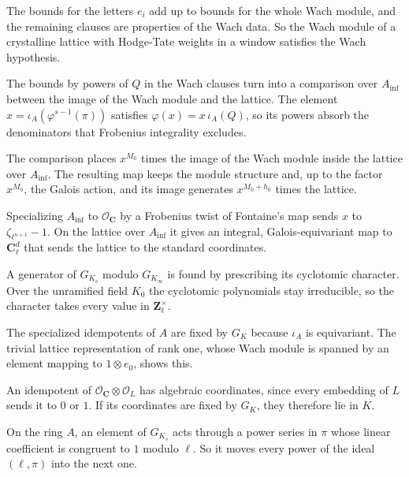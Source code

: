 The bounds for the letters $e_i$ add up to bounds for the whole Wach module,
and the remaining clauses are properties of the Wach data. So the Wach module
of a crystalline lattice with Hodge-Tate weights in a window satisfies the Wach
hypothesis.

The bounds by powers of $Q$ in the Wach clauses turn into a comparison over
$A_{\mathrm{inf}}$ between the image of the Wach module and the lattice. The
element $x=\iota_A(\varphi^{s-1}(\pi))$ satisfies $\varphi(x)=x\,\iota_A(Q)$,
so its powers absorb the denominators that Frobenius integrality excludes.

The comparison places $x^{M_0}$ times the image of the Wach module inside the
lattice over $A_{\mathrm{inf}}$. The resulting map keeps the module structure
and, up to the factor $x^{M_0}$, the Galois action, and its image generates
$x^{M_0+h_0}$ times the lattice.

Specializing $A_{\mathrm{inf}}$ to $\mathcal O_{\mathbf C}$ by a Frobenius twist
of Fontaine's map sends $x$ to $\zeta_{\ell^{n+1}}-1$. On the lattice over
$A_{\mathrm{inf}}$ it gives an integral, Galois-equivariant map to
$\mathbf C_\ell^d$ that sends the lattice to the standard coordinates.

A generator of $G_{K_s}$ modulo $G_{K_\infty}$ is found by prescribing its
cyclotomic character. Over the unramified field $K_0$ the cyclotomic polynomials
stay irreducible, so the character takes every value in $\mathbf Z_\ell^\times$.

The specialized idempotents of $A$ are fixed by $G_K$ because $\iota_A$ is
equivariant. The trivial lattice representation of rank one, whose Wach module
is spanned by an element mapping to $1\otimes e_0$, shows this.

An idempotent of $\mathcal O_{\mathbf C}\otimes\mathcal O_L$ has algebraic
coordinates, since every embedding of $L$ sends it to $0$ or $1$. If its
coordinates are fixed by $G_K$, they therefore lie in $K$.

On the ring $A$, an element of $G_{K_s}$ acts through a power series in $\pi$
whose linear coefficient is congruent to $1$ modulo $\ell$. So it moves every
power of the ideal $(\ell,\pi)$ into the next one.

